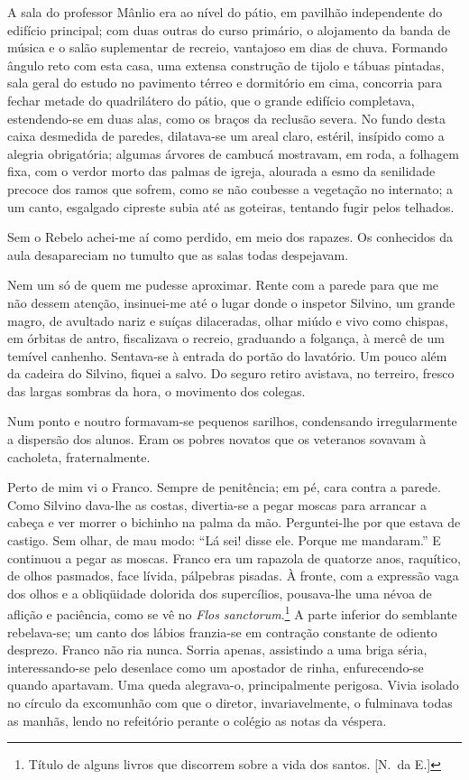 A sala do professor Mânlio era ao nível do
pátio, em pavilhão independente do edifício principal; com duas outras
do curso primário, o alojamento da banda de música e o salão
suplementar de recreio, vantajoso em dias de chuva. Formando ângulo reto com 
esta casa, uma extensa construção de tijolo e tábuas pintadas, sala geral do
estudo no pavimento térreo e dormitório em cima, concorria para fechar
metade do quadrilátero do pátio, que o grande edifício completava,
estendendo{}-se em duas alas, como os braços da reclusão severa. No
fundo desta caixa desmedida de paredes, dilatava{}-se um areal claro,
estéril, insípido como a alegria obrigatória; algumas árvores de
cambucá mostravam, em roda, a folhagem fixa, com o verdor morto das
palmas de igreja, alourada a esmo da senilidade precoce dos ramos que
sofrem, como se não coubesse a vegetação no internato; a um canto,
esgalgado cipreste subia até as goteiras, tentando fugir pelos telhados. 

Sem o Rebelo achei{}-me aí como perdido, em meio dos rapazes.
Os conhecidos da aula desapareciam no tumulto que as salas todas despejavam. 

Nem um só de quem me pudesse aproximar. Rente com a parede
para que me não dessem atenção, insinuei{}-me até o lugar donde o
inspetor Silvino, um grande magro, de avultado nariz e suíças
dilaceradas, olhar miúdo e vivo como chispas, em órbitas de antro,
fiscalizava o recreio, graduando a folgança, à mercê de um temível
canhenho. Sentava{}-se à entrada do portão do lavatório. Um pouco além
da cadeira do Silvino, fiquei a salvo. Do seguro retiro avistava, no
terreiro, fresco das largas sombras da hora, o movimento dos colegas.

Num ponto e noutro formavam{}-se pequenos sarilhos, condensando
irregularmente a dispersão dos alunos. Eram os pobres novatos que os
veteranos sovavam à cacholeta, fraternalmente. 

Perto de mim vi o Franco. Sempre de penitência; em pé, cara contra a parede. 
Como Silvino dava{}-lhe as costas, divertia{}-se a pegar moscas para arrancar a
cabeça e ver morrer o bichinho na palma da mão. Perguntei{}-lhe por que
estava de castigo. Sem olhar, de mau modo: ``Lá sei! disse ele. Porque
me mandaram.'' E continuou a pegar as moscas. Franco era um rapazola de
quatorze anos, raquítico, de olhos pasmados, face lívida, pálpebras
pisadas. À fronte, com a expressão vaga dos olhos e a obliqüidade
dolorida dos supercílios, pousava{}-lhe uma névoa de aflição e
paciência, como se vê no \textit{Flos sanctorum}.\footnote{ Título de alguns 
livros que discorrem sobre a vida dos santos. [N.~da E.]} A parte inferior do semblante
rebelava{}-se; um canto dos lábios franzia{}-se em contração constante
de odiento desprezo. Franco não ria nunca. Sorria apenas, assistindo a
uma briga séria, interessando{}-se pelo desenlace como um apostador de
rinha, enfurecendo{}-se quando apartavam. Uma queda alegrava{}-o,
principalmente perigosa. Vivia isolado no círculo da excomunhão com que
o diretor, invariavelmente, o fulminava todas as manhãs, lendo no
refeitório perante o colégio as notas da véspera. 

